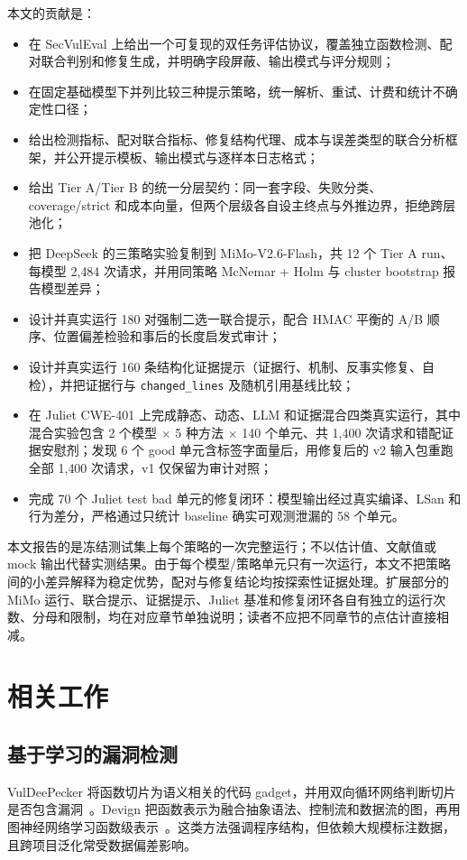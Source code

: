 \documentclass[conference]{IEEEtran}
\begin{document}
本文的贡献是：
\begin{itemize}
    \item 在 SecVulEval 上给出一个可复现的双任务评估协议，覆盖独立函数检测、配对联合判别和修复生成，并明确字段屏蔽、输出模式与评分规则；
    \item 在固定基础模型下并列比较三种提示策略，统一解析、重试、计费和统计不确定性口径；
    \item 给出检测指标、配对联合指标、修复结构代理、成本与误差类型的联合分析框架，并公开提示模板、输出模式与逐样本日志格式；
    \item 给出 Tier A/Tier B 的统一分层契约：同一套字段、失败分类、coverage/strict 和成本向量，但两个层级各自设主终点与外推边界，拒绝跨层池化；
    \item 把 DeepSeek 的三策略实验复制到 MiMo-V2.6-Flash，共 12 个 Tier A run、每模型 2{,}484 次请求，并用同策略 McNemar + Holm 与 cluster bootstrap 报告模型差异；
    \item 设计并真实运行 180 对强制二选一联合提示，配合 HMAC 平衡的 A/B 顺序、位置偏差检验和事后的长度启发式审计；
    \item 设计并真实运行 160 条结构化证据提示（证据行、机制、反事实修复、自检），并把证据行与 \texttt{changed\_lines} 及随机引用基线比较；
    \item 在 Juliet CWE-401 上完成静态、动态、LLM 和证据混合四类真实运行，其中混合实验包含 2 个模型 $\times$ 5 种方法 $\times$ 140 个单元、共 1{,}400 次请求和错配证据安慰剂；发现 6 个 good 单元含标签字面量后，用修复后的 v2 输入包重跑全部 1{,}400 次请求，v1 仅保留为审计对照；
    \item 完成 70 个 Juliet test bad 单元的修复闭环：模型输出经过真实编译、LSan 和行为差分，严格通过只统计 baseline 确实可观测泄漏的 58 个单元。
\end{itemize}

本文报告的是冻结测试集上每个策略的一次完整运行；不以估计值、文献值或 mock 输出代替实测结果。由于每个模型/策略单元只有一次运行，本文不把策略间的小差异解释为稳定优势，配对与修复结论均按探索性证据处理。扩展部分的 MiMo 运行、联合提示、证据提示、Juliet 基准和修复闭环各自有独立的运行次数、分母和限制，均在对应章节单独说明；读者不应把不同章节的点估计直接相减。

\section{相关工作}
\label{sec:related}

\subsection{基于学习的漏洞检测}
VulDeePecker 将函数切片为语义相关的代码 gadget，并用双向循环网络判断切片是否包含漏洞~\cite{li2018vuldeepecker}。Devign 把函数表示为融合抽象语法、控制流和数据流的图，再用图神经网络学习函数级表示~\cite{zhou2019devign}。这类方法强调程序结构，但依赖大规模标注数据，且跨项目泛化常受数据偏差影响。
\end{document}
